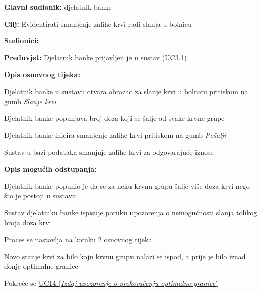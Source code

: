 					
					\noindent {}
					\begin{packed_item} \label{UC13}
	
						\item \textbf{Glavni sudionik: }djelatnik banke
						\item  \textbf{Cilj:} Evidentirati smanjenje zalihe krvi radi slanja u bolnicu
						\item  \textbf{Sudionici:} 
						\item  \textbf{Preduvjet:} Djelatnik banke prijavljen je u sustav (\hyperref[UC3.1]{UC3.1})
						\item  \textbf{Opis osnovnog tijeka:}
						
						\item[] \begin{packed_enum}
	                        \item Djelatnik banke u sustavu otvara obrazac za slanje krvi u bolnicu pritiskom na gumb \textit{Slanje krvi}
                            \item Djelatnik banke popunjava broj doza koji se šalje od svake krvne grupe
                            \item Djelatnik banke inicira smanjenje zalihe krvi pritiskom na gumb \textit{Pošalji}
                        	\item Sustav u bazi podataka smanjuje zalihe krvi za odgovarajuće iznose
						\end{packed_enum}
						
						\item  \textbf{Opis mogućih odstupanja:}
						
						\item[] \begin{packed_item}
						
							\item[3] Djelatnik banke popunio je da se za neku krvnu grupu šalje više doza krvi nego što je postoji u sustavu
							\item[] \begin{packed_enum}
								\item Sustav djelatniku banke ispisuje poruku upozorenja o nemogućnosti slanja tolikog broja doza krvi 
								\item Proces se nastavlja na koraku 2 osnovnog tijeka
							\end{packed_enum}
							
							\item[4] Novo stanje krvi za bilo koju krvnu grupu nalazi se ispod, a prije je bilo iznad donje optimalne granice 
                            \item[] \begin{packed_enum} 
                                \item Pokreće se \hyperref[UC14]{UC14 (\textit{Izdaj upozorenje o prekoračenju optimalne granice})}
							\end{packed_enum}

						\end{packed_item}
						
					\end{packed_item}
					
